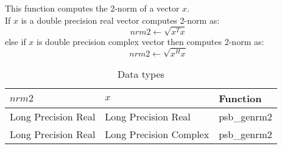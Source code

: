 %
%



This function computes the 2-norm of a vector $x$.\\
If $x$ is a double precision real  vector
computes 2-norm as:
\[ nrm2 \leftarrow \sqrt{x^T x}\]
else if $x$ is double precision complex vector then computes 2-norm  as:
\[ nrm2 \leftarrow \sqrt{x^H x}\]

\begin{table}[h]
\begin{center}
\begin{tabular}{lll}
\hline
$nrm2$ & $x$ & {\bf Function}\\
\hline
Long Precision Real&Long Precision Real & psb\_genrm2 \\
Long Precision Real&Long Precision Complex & psb\_genrm2 \\
\hline
\end{tabular}
\end{center}
\caption{Data types\label{tab:f90nrm2}}
\end{table}

